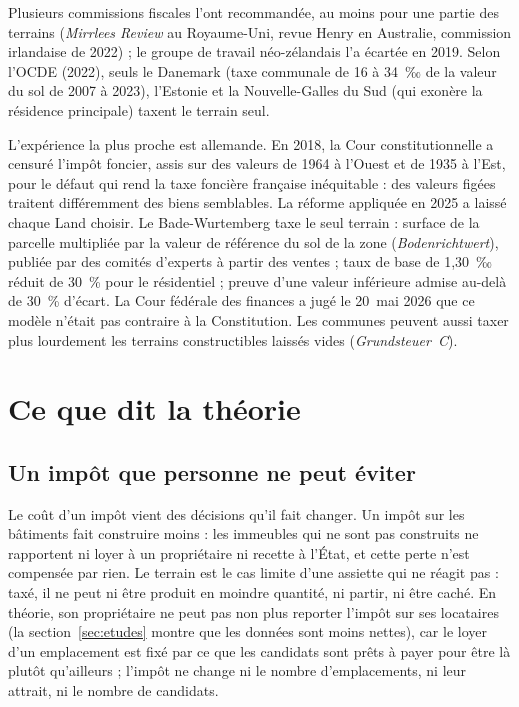 \documentclass[11pt,a4paper]{article}
\begin{document}
Plusieurs commissions fiscales l'ont recommandée, au moins pour une partie des terrains
(\emph{Mirrlees Review} au Royaume-Uni, revue Henry en Australie, commission irlandaise de 2022) ;
le groupe de travail néo-zélandais l'a écartée en 2019. Selon l'OCDE (2022), seuls le Danemark (taxe communale de 16 à 34~‰ de la valeur du sol de 2007 à
2023), l'Estonie et la Nouvelle-Galles du Sud (qui exonère la résidence principale) taxent le
terrain seul.

L'expérience la plus proche est allemande. En 2018, la Cour constitutionnelle a censuré l'impôt
foncier, assis sur des valeurs de 1964 à l'Ouest et de 1935 à l'Est, pour le défaut qui rend la
taxe foncière française inéquitable : des valeurs figées traitent différemment des biens
semblables. La réforme appliquée en 2025 a laissé chaque Land choisir. Le Bade-Wurtemberg taxe le
seul terrain : surface de la parcelle multipliée par la valeur de référence du sol de la zone
(\emph{Bodenrichtwert}), publiée par des comités d'experts à partir des ventes ; taux de base de
1,30~‰ réduit de 30~\% pour le résidentiel ; preuve d'une valeur inférieure admise au-delà de
30~\% d'écart. La Cour fédérale des finances a jugé le 20~mai 2026 que ce modèle n'était pas
contraire à la Constitution. Les communes peuvent aussi taxer plus lourdement les terrains
constructibles laissés vides (\emph{Grundsteuer~C}).

\section{Ce que dit la théorie}

\subsection{Un impôt que personne ne peut éviter}

Le coût d'un impôt vient des décisions qu'il fait changer. Un impôt sur les bâtiments fait
construire moins : les immeubles qui ne sont pas construits ne rapportent ni loyer à un propriétaire
ni recette à l'État, et cette perte n'est compensée par rien. Le terrain est le cas limite d'une assiette qui ne réagit pas : taxé, il ne peut ni être
produit en moindre quantité, ni partir, ni être caché. En théorie, son propriétaire ne peut pas non
plus reporter l'impôt sur ses locataires (la section~\ref{sec:etudes} montre que les données sont
moins nettes), car le loyer d'un emplacement est fixé par ce que les
candidats sont prêts à payer pour être là plutôt qu'ailleurs ; l'impôt ne change ni le nombre
d'emplacements, ni leur attrait, ni le nombre de candidats.
\end{document}
